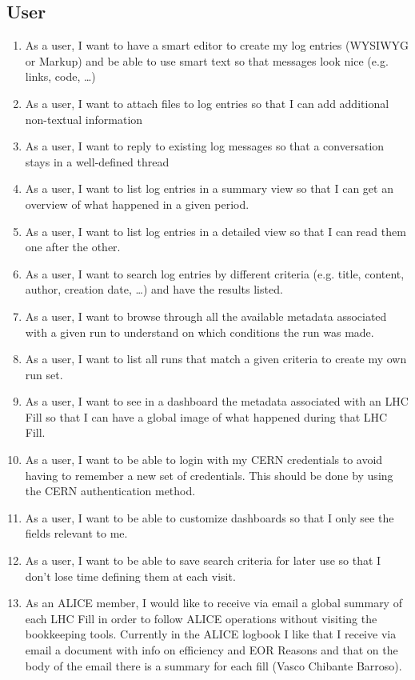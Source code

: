 \subsection{User}
\begin{enumerate}
  \item As a user, I want to have a smart editor to create my log entries (WYSIWYG or Markup) and be able to use smart text so that messages look nice (e.g. links, code, …) 
  \item As a user, I want to attach files to log entries so that I can add additional non-textual information
  \item As a user, I want to reply to existing log messages so that a conversation stays in a well-defined thread
  \item As a user, I want to list log entries in a summary view so that I can get an overview of what happened in a given period.
  \item As a user, I want to list log entries in a detailed view so that I can read them one after the other.
  \item As a user, I want to search log entries by different criteria (e.g. title, content, author, creation date, …) and have the results listed. 
  \item As a user, I want to browse through all the available metadata associated with a given run to understand on which conditions the run was made. 
  \item As a user, I want to list all runs that match a given criteria to create my own run set. 
  \item As a user, I want to see in a dashboard the metadata associated with an LHC Fill so that I can have a global image of what happened during that LHC Fill. 
  \item As a user, I want to be able to login with my CERN credentials to avoid having to remember a new set of credentials. This should be done by using the CERN authentication method.
  \item As a user, I want to be able to customize dashboards so that I only see the fields relevant to me. 
  \item As a user, I want to be able to save search criteria for later use so that I don’t lose time defining them at each visit. 
  \item As an ALICE member, I would like to receive via email a global summary of each LHC Fill in order to follow ALICE operations without visiting the bookkeeping tools. Currently in the ALICE logbook I like that I receive via email a document with info on efficiency and EOR Reasons and that on the body of the email there is a summary for each fill (Vasco Chibante Barroso).

\end{enumerate}
